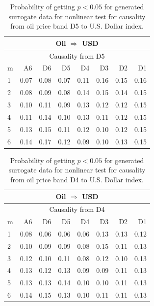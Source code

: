 %
%
\begin{table}[H]
\begin{center}
\begin{tabular}{l|r r r r r r r}
\hline\hline
\multicolumn{8}{c}{Oil $\Rightarrow$ USD}\\
\hline
\multicolumn{8}{c}{Causality from D5}\\
\hline\hline
m & A6 & D6 & D5 & D4 & D3 & D2 & D1 \\
\hline
1 & 0.07 & 0.08 & 0.07 & 0.11 & 0.16 & 0.15 & 0.16 \\
2 & 0.08 & 0.09 & 0.08 & 0.14 & 0.15 & 0.14 & 0.15 \\
3 & 0.10 & 0.11 & 0.09 & 0.13 & 0.12 & 0.12 & 0.15 \\
4 & 0.11 & 0.14 & 0.10 & 0.13 & 0.11 & 0.12 & 0.15 \\
5 & 0.13 & 0.15 & 0.11 & 0.12 & 0.10 & 0.12 & 0.15 \\
6 & 0.14 & 0.17 & 0.12 & 0.09 & 0.10 & 0.13 & 0.15 \\
\hline\hline
\end{tabular}
\caption{Probability of getting $p < 0.05$ for generated surrogate data for nonlinear test for causality from oil price band D5 to U.S. Dollar index.}
\end{center}
\end{table}

%
%
\begin{table}[H]
\begin{center}
\begin{tabular}{l|r r r r r r r}
\hline\hline
\multicolumn{8}{c}{Oil $\Rightarrow$ USD}\\
\hline
\multicolumn{8}{c}{Causality from D4}\\
\hline\hline
m & A6 & D6 & D5 & D4 & D3 & D2 & D1 \\
\hline
1 & 0.08 & 0.06 & 0.06 & 0.06 & 0.13 & 0.13 & 0.12 \\
2 & 0.10 & 0.09 & 0.09 & 0.08 & 0.15 & 0.11 & 0.13 \\
3 & 0.12 & 0.10 & 0.11 & 0.08 & 0.12 & 0.10 & 0.13 \\
4 & 0.13 & 0.12 & 0.13 & 0.09 & 0.09 & 0.11 & 0.13 \\
5 & 0.13 & 0.13 & 0.14 & 0.10 & 0.10 & 0.11 & 0.13 \\
6 & 0.14 & 0.15 & 0.13 & 0.10 & 0.11 & 0.11 & 0.13 \\
\hline\hline
\end{tabular}
\caption{Probability of getting $p < 0.05$ for generated surrogate data for nonlinear test for causality from oil price band D4 to U.S. Dollar index.}
\end{center}
\end{table}

